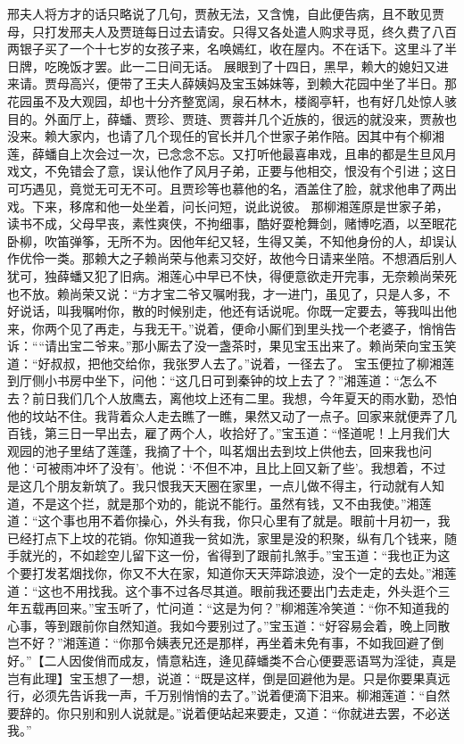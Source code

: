 \documentclass[12pt,oneside]{book}
\begin{document}
邢夫人将方才的话只略说了几句，贾赦无法，又含愧，自此便告病，且不敢见贾母，只打发邢夫人及贾琏每日过去请安。只得又各处遣人购求寻觅，终久费了八百两银子买了一个十七岁的女孩子来，名唤嫣红，收在屋内。不在话下。这里斗了半日牌，吃晚饭才罢。此一二日间无话。
展眼到了十四日，黑早，赖大的媳妇又进来请。贾母高兴，便带了王夫人薛姨妈及宝玉姊妹等，到赖大花园中坐了半日。那花园虽不及大观园，却也十分齐整宽阔，泉石林木，楼阁亭轩，也有好几处惊人骇目的。外面厅上，薛蟠、贾珍、贾琏、贾蓉并几个近族的，很远的就没来，贾赦也没来。赖大家内，也请了几个现任的官长并几个世家子弟作陪。因其中有个柳湘莲，薛蟠自上次会过一次，已念念不忘。又打听他最喜串戏，且串的都是生旦风月戏文，不免错会了意，误认他作了风月子弟，正要与他相交，恨没有个引进；这日可巧遇见，竟觉无可无不可。且贾珍等也慕他的名，酒盖住了脸，就求他串了两出戏。下来，移席和他一处坐着，问长问短，说此说彼。
那柳湘莲原是世家子弟，读书不成，父母早丧，素性爽侠，不拘细事，酷好耍枪舞剑，赌博吃酒，以至眠花卧柳，吹笛弹筝，无所不为。因他年纪又轻，生得又美，不知他身份的人，却误认作优伶一类。那赖大之子赖尚荣与他素习交好，故他今日请来坐陪。不想酒后别人犹可，独薛蟠又犯了旧病。湘莲心中早已不快，得便意欲走开完事，无奈赖尚荣死也不放。赖尚荣又说：“方才宝二爷又嘱咐我，才一进门，虽见了，只是人多，不好说话，叫我嘱咐你，散的时候别走，他还有话说呢。你既一定要去，等我叫出他来，你两个见了再走，与我无干。”说着，便命小厮们到里头找一个老婆子，悄悄告诉：““请出宝二爷来。”那小厮去了没一盏茶时，果见宝玉出来了。赖尚荣向宝玉笑道：“好叔叔，把他交给你，我张罗人去了。”说着，一径去了。
宝玉便拉了柳湘莲到厅侧小书房中坐下，问他：“这几日可到秦钟的坟上去了？”湘莲道：“怎么不去？前日我们几个人放鹰去，离他坟上还有二里。我想，今年夏天的雨水勤，恐怕他的坟站不住。我背着众人走去瞧了一瞧，果然又动了一点子。回家来就便弄了几百钱，第三日一早出去，雇了两个人，收拾好了。”宝玉道：“怪道呢！上月我们大观园的池子里结了莲蓬，我摘了十个，叫茗烟出去到坟上供他去，回来我也问他：‘可被雨冲坏了没有’。他说：‘不但不冲，且比上回又新了些’。我想着，不过是这几个朋友新筑了。我只恨我天天圈在家里，一点儿做不得主，行动就有人知道，不是这个拦，就是那个劝的，能说不能行。虽然有钱，又不由我使。”湘莲道：“这个事也用不着你操心，外头有我，你只心里有了就是。眼前十月初一，我已经打点下上坟的花销。你知道我一贫如洗，家里是没的积聚，纵有几个钱来，随手就光的，不如趁空儿留下这一份，省得到了跟前扎煞手。”宝玉道：“我也正为这个要打发茗烟找你，你又不大在家，知道你天天萍踪浪迹，没个一定的去处。”湘莲道：“这也不用找我。这个事不过各尽其道。眼前我还要出门去走走，外头逛个三年五载再回来。”宝玉听了，忙问道：“这是为何？”柳湘莲冷笑道：“你不知道我的心事，等到跟前你自然知道。我如今要别过了。”宝玉道：“好容易会着，晚上同散岂不好？”湘莲道：“你那令姨表兄还是那样，再坐着未免有事，不如我回避了倒好。”【二人因俊俏而成友，情意粘连，逄见薛蟠类不合心便要恶语骂为淫徒，真是岂有此理】宝玉想了一想，说道：“既是这样，倒是回避他为是。只是你要果真远行，必须先告诉我一声，千万别悄悄的去了。”说着便滴下泪来。柳湘莲道：“自然要辞的。你只别和别人说就是。”说着便站起来要走，又道：“你就进去罢，不必送我。”
\end{document}
